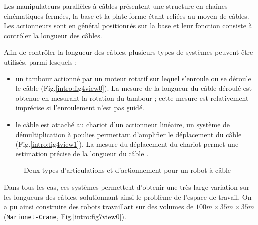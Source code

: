 Les manipulateurs parallèles à câbles présentent une structure en chaînes 
cinéma\-tiques fermées, la base et la plate-forme étant reliées au moyen de 
câbles. Les actionneurs sont en général positionnés sur la base et leur fonction 
consiste à contrôler la longueur des câbles.

Afin de contrôler la longueur des câbles, plusieurs types de systèmes peuvent 
être utilisés, parmi lesquels :
\begin{itemize}
 \item un tambour actionné par un moteur rotatif sur lequel s'enroule ou se 
déroule le câble (Fig.\ref{intro:fig4view0}). La mesure de la longueur du câble 
déroulé est obtenue en mesurant la rotation du tambour ; cette mesure est 
relativement imprécise si l'enroulement n'est pas guidé.
 \item le câble est attaché au chariot d'un actionneur linéaire, un système de 
démultiplication à poulies permettant d'amplifier le déplacement du câble 
(Fig.\ref{intro:fig4view1}). La mesure du déplacement du chariot permet une 
estimation précise de la longueur du câble \cite{merlet2008}. 
\end{itemize}

\begin{figure}[!ht]
  \centering
\hfill
    \caption{\footnotesize Deux types d'articulations et d'actionnement pour un 
robot à câble}
\label{intro:fig4}
\end{figure}

Dans tous les cas, ces systèmes permettent d'obtenir une très large variation 
sur les longueurs des câbles, solutionnant ainsi le problème de l'espace de 
travail. On a pu ainsi construire des robots travaillant sur des volumes de
$100m\times35m\times35m$ ({\tt Marionet-Crane}, \cite{merlet2010} 
Fig.\ref{intro:fig7view0}).

